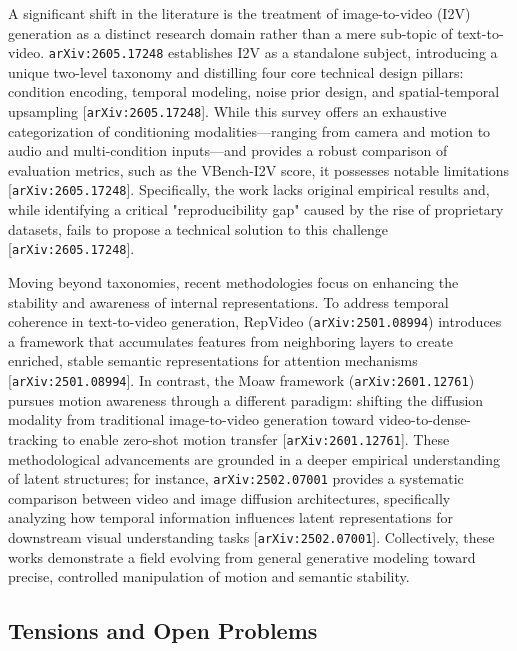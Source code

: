 \documentclass[11pt]{article}
\begin{document}
A significant shift in the literature is the treatment of image-to-video (I2V) generation as a distinct research domain rather than a mere sub-topic of text-to-video. \texttt{arXiv:2605.17248} establishes I2V as a standalone subject, introducing a unique two-level taxonomy and distilling four core technical design pillars: condition encoding, temporal modeling, noise prior design, and spatial-temporal upsampling [\texttt{arXiv:2605.17248}]. While this survey offers an exhaustive categorization of conditioning modalities—ranging from camera and motion to audio and multi-condition inputs—and provides a robust comparison of evaluation metrics, such as the VBench-I2V score, it possesses notable limitations [\texttt{arXiv:2605.17248}]. Specifically, the work lacks original empirical results and, while identifying a critical "reproducibility gap" caused by the rise of proprietary datasets, fails to propose a technical solution to this challenge [\texttt{arXiv:2605.17248}].

Moving beyond taxonomies, recent methodologies focus on enhancing the stability and awareness of internal representations. To address temporal coherence in text-to-video generation, RepVideo (\texttt{arXiv:2501.08994}) introduces a framework that accumulates features from neighboring layers to create enriched, stable semantic representations for attention mechanisms [\texttt{arXiv:2501.08994}]. In contrast, the Moaw framework (\texttt{arXiv:2601.12761}) pursues motion awareness through a different paradigm: shifting the diffusion modality from traditional image-to-video generation toward video-to-dense-tracking to enable zero-shot motion transfer [\texttt{arXiv:2601.12761}]. These methodological advancements are grounded in a deeper empirical understanding of latent structures; for instance, \texttt{arXiv:2502.07001} provides a systematic comparison between video and image diffusion architectures, specifically analyzing how temporal information influences latent representations for downstream visual understanding tasks [\texttt{arXiv:2502.07001}]. Collectively, these works demonstrate a field evolving from general generative modeling toward precise, controlled manipulation of motion and semantic stability.

\subsection{Tensions and Open Problems}
\end{document}
